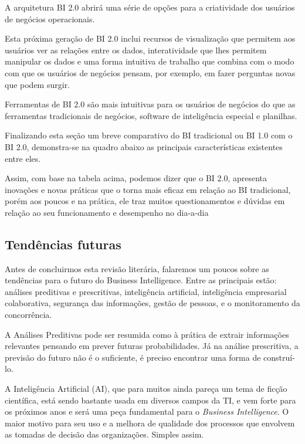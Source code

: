 A arquitetura BI 2.0 abrir\'{a} uma s\'{e}rie de op\c{c}\~{o}es para a criatividade dos usu\'{a}rios de neg\'{o}cios operacionais. 

Esta pr\'{o}xima gera\c{c}\~{a}o de BI 2.0 inclui recursos de visualiza\c{c}\~{a}o que permitem aos usu\'{a}rios ver as rela\c{c}\~{o}es entre os dados, interatividade que lhes permitem manipular os dados e uma forma intuitiva de trabalho que combina com o modo com que os usu\'{a}rios de neg\'{o}cios pensam, por exemplo, em fazer perguntas novas que podem surgir. 

Ferramentas de BI 2.0 s\~{a}o mais intuitivas para os usu\'{a}rios de neg\'{o}cios do que as ferramentas tradicionais de neg\'{o}cios, software de intelig\^{e}ncia especial e planilhas.

Finalizando esta se\c{c}\~{a}o um breve comparativo do BI tradicional ou BI 1.0 com o BI 2.0, demonstra-se na quadro abaixo as principais caracter\'{i}sticas existentes entre eles.



Assim, com base na tabela acima, podemos dizer que o BI 2.0, apresenta inova\c{c}\~{o}es e novas pr\'{a}ticas que o torna mais eficaz em rela\c{c}\~{a}o ao BI tradicional, por\'{e}m aos poucos e na pr\'{a}tica, ele traz muitos questionamentos e dúvidas em rela\c{c}\~{a}o ao seu funcionamento e desempenho no dia-a-dia

\subsection{Tend\^{e}ncias futuras}

Antes de concluirmos esta revis\~{a}o liter\'{a}ria, falaremos um poucos sobre as tend\^{e}ncias para o futuro do Business Intelligence. Entre as principais est\~{a}o: an\'{a}lises preditivas e prescritivas, intelig\^{e}ncia artificial, intelig\^{e}ncia empresarial colaborativa, seguran\c{c}a das informa\c{c}\~{o}es, gest\~{a}o de pessoas, e o monitoramento da concorr\^{e}ncia.

A An\'{a}lises Preditivas pode ser resumida como \`{a} pr\'{a}tica de extrair informa\c{c}\~{o}es relevantes pensando em prever futuras probabilidades. J\'{a} na an\'{a}lise prescritiva, a previs\~{a}o do futuro n\~{a}o \'{e} o suficiente, \'{e} preciso encontrar uma forma de constru\'{i}-lo.

A Intelig\^{e}ncia Artificial (AI), que para muitos ainda pare\c{c}a um tema de fic\c{c}\~{a}o cient\'{i}fica, est\'{a} sendo bastante usada em diversos campos da TI, e vem forte para os pr\'{o}ximos anos e ser\'{a} uma pe\c{c}a fundamental para o \textit{Business Intelligence}. O maior motivo para seu uso e a melhora de qualidade dos processos que envolvem as tomadas de decis\~{a}o das organiza\c{c}\~{o}es. Simples assim.

